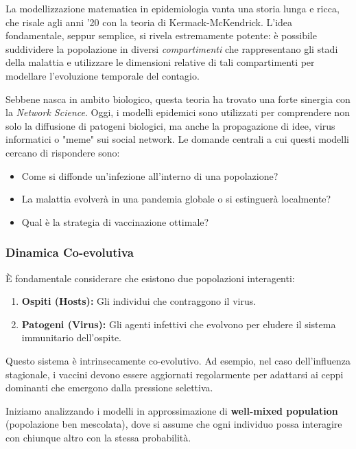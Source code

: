 La modellizzazione matematica in epidemiologia vanta una storia lunga e ricca, che risale agli anni '20 con la teoria di Kermack-McKendrick. L'idea fondamentale, seppur semplice, si rivela estremamente potente: è possibile suddividere la popolazione in diversi \textit{compartimenti} che rappresentano gli stadi della malattia e utilizzare le dimensioni relative di tali compartimenti per modellare l'evoluzione temporale del contagio.

Sebbene nasca in ambito biologico, questa teoria ha trovato una forte sinergia con la \textit{Network Science}. Oggi, i modelli epidemici sono utilizzati per comprendere non solo la diffusione di patogeni biologici, ma anche la propagazione di idee, virus informatici o "meme" sui social network.
Le domande centrali a cui questi modelli cercano di rispondere sono:
\begin{itemize}
    \item Come si diffonde un'infezione all'interno di una popolazione?
    \item La malattia evolverà in una pandemia globale o si estinguerà localmente?
    \item Qual è la strategia di vaccinazione ottimale?
\end{itemize}

\subsubsection{Dinamica Co-evolutiva}
È fondamentale considerare che esistono due popolazioni interagenti:
\begin{enumerate}
    \item \textbf{Ospiti (Hosts):} Gli individui che contraggono il virus.
    \item \textbf{Patogeni (Virus):} Gli agenti infettivi che evolvono per eludere il sistema immunitario dell'ospite.
\end{enumerate}
Questo sistema è intrinsecamente co-evolutivo. Ad esempio, nel caso dell'influenza stagionale, i vaccini devono essere aggiornati regolarmente per adattarsi ai ceppi dominanti che emergono dalla pressione selettiva.

\hfill

\noindent Iniziamo analizzando i modelli in approssimazione di \textbf{well-mixed population} (popolazione ben mescolata), dove si assume che ogni individuo possa interagire con chiunque altro con la stessa probabilità.

